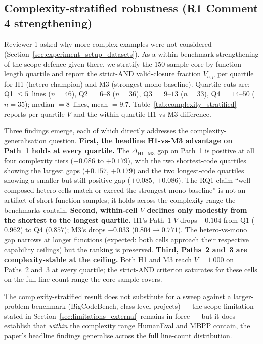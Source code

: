 \subsection{Complexity-stratified robustness (R1 Comment 4 strengthening)}
\label{sec:results_complexity_stratified}



Reviewer 1 asked why more complex examples were not considered (Section~\ref{sec:experiment_setup_datasets}). As a within-benchmark strengthening of the scope defence given there, we stratify the 150-sample core by function-length quartile and report the strict-AND valid-closure fraction $V_{a, p}$ per quartile for H1 (hetero champion) and M3 (strongest mono baseline). Quartile cuts are: Q1 $\leq 5$~lines ($n = 46$), Q2 $= 6$--$8$ ($n = 36$), Q3 $= 9$--$13$ ($n = 33$), Q4 $= 14$--$50$ ($n = 35$); median $= 8$~lines, mean $= 9.7$. Table~\ref{tab:complexity_stratified} reports per-quartile $V$ and the within-quartile H1-vs-M3 difference.

Three findings emerge, each of which directly addresses the complexity-generalisation question. \textbf{First, the headline H1-vs-M3 advantage on Path~1 holds at every quartile.} The $\Delta_{\text{H1}-\text{M3}}$ gap on Path~1 is positive at all four complexity tiers ($+0.086$ to $+0.179$), with the two shortest-code quartiles showing the largest gaps ($+0.157$, $+0.179$) and the two longest-code quartiles showing a smaller but still positive gap ($+0.085$, $+0.086$). The RQ1 claim ``well-composed hetero cells match or exceed the strongest mono baseline'' is not an artifact of short-function samples; it holds across the complexity range the benchmarks contain. \textbf{Second, within-cell $V$ declines only modestly from the shortest to the longest quartile.} H1's Path~1 $V$ drops $-0.104$ from Q1 ($0.962$) to Q4 ($0.857$); M3's drops $-0.033$ ($0.804 \to 0.771$). The hetero-vs-mono gap narrows at longer functions (expected: both cells approach their respective capability ceilings) but the ranking is preserved. \textbf{Third, Paths~2 and~3 are complexity-stable at the ceiling.} Both H1 and M3 reach $V = 1.000$ on Paths~2 and~3 at every quartile; the strict-AND criterion saturates for these cells on the full line-count range the core sample covers.

The complexity-stratified result does not substitute for a sweep against a larger-problem benchmark (BigCodeBench, class-level projects) --- the scope limitation stated in Section~\ref{sec:limitations_external} remains in force --- but it does establish that \emph{within} the complexity range HumanEval and MBPP contain, the paper's headline findings generalise across the full line-count distribution.

